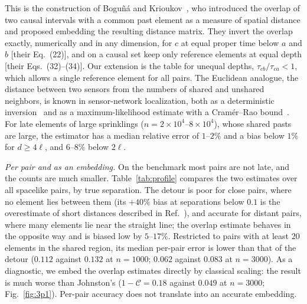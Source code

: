 \documentclass[prd,twocolumn,superscriptaddress,nofootinbib,amsmath,amssymb,floatfix]{revtex4-2}
\begin{document}
This is the construction of Bogu\~n\'a and Krioukov~\cite{BK24}, who introduced the overlap of two causal intervals with a common past element as a measure of spatial distance and proposed embedding the resulting distance matrix. They invert the overlap exactly, numerically and in any dimension, for $c$ at equal proper time below $a$ and $b$ [their Eq.~(22)], and on a causal set keep only reference elements at equal depth [their Eqs.~(32)--(34)]. Our extension is the table for unequal depths, $\tau_{cb}/\tau_{ca}<1$, which allows a single reference element for all pairs. The Euclidean analogue, the distance between two sensors from the numbers of shared and unshared neighbors, is known in sensor-network localization, both as a deterministic inversion~\cite{Buschmann06} and as a maximum-likelihood estimate with a Cram\'er--Rao bound~\cite{Huang14}. For late elements of large sprinklings ($n=2\times10^4$--$8\times10^4$), whose shared pasts are large, the estimator has a median relative error of $1$--$2\%$ and a bias below $1\%$ for $d\geq4\ell$, and $6$--$8\%$ below $2\ell$.

\emph{Per pair and as an embedding.} On the benchmark most pairs are not late, and the counts are much smaller. Table~\ref{tab:profile} compares the two estimates over all spacelike pairs, by true separation. The detour is poor for close pairs, where no element lies between them (its $+40\%$ bias at separations below $0.1$ is the overestimate of short distances described in Ref.~\cite{ESV19}), and accurate for distant pairs, where many elements lie near the straight line; the overlap estimate behaves in the opposite way and is biased low by $5$--$17\%$. Restricted to pairs with at least $20$ elements in the shared region, its median per-pair error is lower than that of the detour ($0.112$ against $0.132$ at $n=1000$; $0.062$ against $0.083$ at $n=3000$). As a diagnostic, we embed the overlap estimates directly by classical scaling: the result is much worse than Johnston's ($1-\mathcal C=0.18$ against $0.049$ at $n=3000$; Fig.~\ref{fig:3p1}). Per-pair accuracy does not translate into an accurate embedding.
\end{document}
